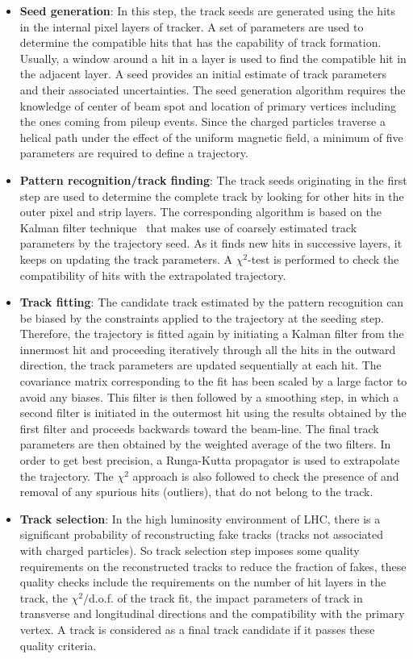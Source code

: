 \begin{itemize}[leftmargin=*]
\item {\bf{Seed generation}}: In this step, the track seeds are generated using the hits in the internal pixel layers of tracker. A set of parameters are used to determine
  the compatible hits that has the capability of track formation. Usually, a window around a hit in a layer is used to find the compatible hit in the adjacent layer.
  A seed provides an initial estimate of track parameters and their associated uncertainties. The seed generation algorithm requires the knowledge of
  center of beam spot and location of primary vertices including the ones coming from pileup events. Since the charged particles traverse a helical path under the effect
  of the uniform magnetic field, a minimum of five parameters are required to define a trajectory.   
\item {\bf{Pattern recognition/track finding}}: The track seeds originating in the first step are used to determine the complete track by looking for other hits in the
  outer pixel and strip layers. The corresponding algorithm is based on the Kalman filter technique~\cite{Fruhwirth:1987fm, Billoir:1989mh, Billoir:1990we}
  that makes use of coarsely estimated track parameters by
  the trajectory seed. As it finds new hits in successive layers, it keeps on updating the track parameters. A $\chi^{2}$-test is performed to check the
  compatibility of hits with the extrapolated trajectory.   
\item {\bf{Track fitting}}: The candidate track estimated by the pattern recognition can be biased by the constraints applied to the trajectory at the
  seeding step. Therefore, the trajectory is fitted again by initiating a Kalman filter from the innermost hit and proceeding iteratively through all the hits
  in the outward direction, the track parameters are updated sequentially at each hit. The covariance matrix corresponding to the fit has been scaled by a large
  factor to avoid any biases. This filter is then followed by a smoothing step, in which a second
  filter is initiated in the outermost hit using the results obtained by the first filter and proceeds backwards toward the beam-line. The final track parameters
  are then obtained by the weighted average of the two filters. In order to get best precision, a Runga-Kutta propagator is used to extrapolate the
  trajectory. The $\chi^{2}$ approach is also followed to check the presence of and removal of any spurious hits (outliers), that do not belong to the track.
\item {\bf{Track selection}}: In the high luminosity environment of LHC, there is a significant probability of reconstructing fake tracks (tracks not associated with
  charged particles). So track selection step imposes some quality requirements on the reconstructed tracks to reduce the fraction of fakes,
  these quality checks include the requirements on the number of hit layers in the track, the $\chi^{2}/$d.o.f. of the track fit,
  the impact parameters of track in transverse and longitudinal directions and the compatibility with the primary vertex.
  A track is considered as a final track candidate if it passes these quality criteria.
\end{itemize}
